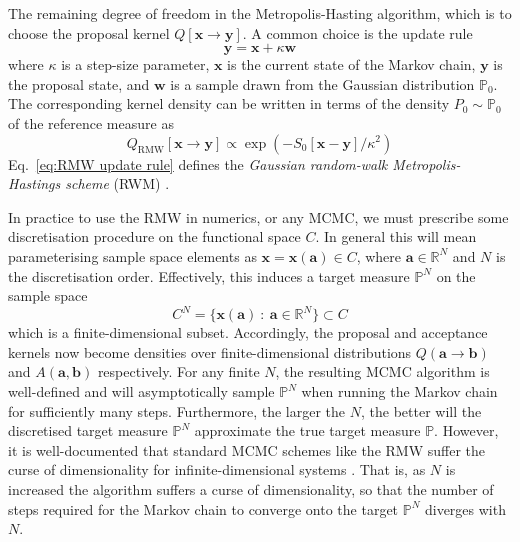 The remaining degree of freedom in the Metropolis-Hasting algorithm, which is to choose the proposal kernel $Q[\mathbf{x} \to \mathbf{y}]$. A common choice is the update rule
\begin{equation} \label{eq:RMW update rule}
	\mathbf{y} = \mathbf{x} + \kappa \mathbf{w}
\end{equation}
where $\kappa$ is a step-size parameter, $\mathbf{x}$ is the current state of the Markov chain, $\mathbf{y}$ is the proposal state, and $\mathbf{w}$ is a sample drawn from the Gaussian distribution $\mathbb{P}_0$. The corresponding kernel density can be written in terms of the density $P_0 \sim \mathbb{P}_0$ of the reference measure as
\begin{equation} \label{eq:RMW transition kernel}
	Q_\text{RMW}[\mathbf{x} \to \mathbf{y}] \propto \exp ( - S_0[\mathbf{x} - \mathbf{y}] / \kappa^2 ) 
\end{equation}
Eq.~\ref{eq:RMW update rule} defines the \textit{Gaussian random-walk Metropolis-Hastings scheme} (RWM) \citep{metropolisEquationStateCalculations1953, hastingsMonteCarloSampling1970}.



In practice to use the RMW in numerics, or any MCMC, we must prescribe some discretisation procedure on the functional space $C$. In general this will mean parameterising sample space elements as $\mathbf{x} = \mathbf{x}(\mathbf{a}) \in C$, where $\mathbf{a} \in \mathbb{R}^N$ and $N$ is the discretisation order. Effectively, this induces a target measure $\mathbb{P}^N$ on the sample space
\begin{equation}
	C^N = \{ \mathbf{x}(\mathbf{a})\ :\ \mathbf{a} \in \mathbb{R}^N \} \subset C
\end{equation}
which is a finite-dimensional subset. Accordingly, the proposal and acceptance kernels now become densities over finite-dimensional distributions $Q(\mathbf{a} \to \mathbf{b})$ and $A(\mathbf{a}, \mathbf{b})$ respectively. For any finite $N$, the resulting MCMC algorithm is well-defined and will asymptotically sample $\mathbb{P}^N$ when running the Markov chain for sufficiently many steps. Furthermore, the larger the $N$, the better will the discretised target measure $\mathbb{P}^N$ approximate the true target measure $\mathbb{P}$. However, it is well-documented that standard MCMC schemes like the RMW suffer the curse of dimensionality \citep{bellmanAdaptiveControlProcesses1961} for infinite-dimensional systems \citep{cotterMCMCMethodsFunctions2013, hairerSpectralGapsMetropolis2014}. That is, as $N$ is increased the algorithm suffers a curse of dimensionality, so that the number of steps required for the Markov chain to converge onto the target $\mathbb{P}^N$ diverges with $N$.

